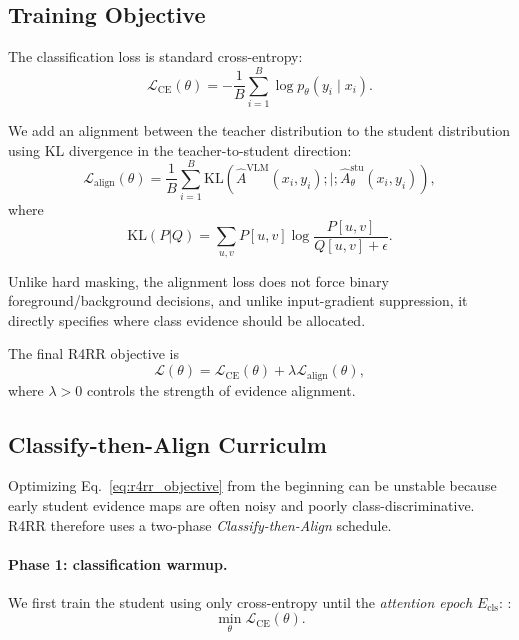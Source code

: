 \subsection{Training Objective}
\label{sec:objective}

The classification loss is standard cross-entropy:
\begin{equation}
\mathcal{L}_{\mathrm{CE}}(\theta)=-\frac{1}{B}
\sum_{i=1}^{B}
\log p_\theta(y_i\mid x_i).
\end{equation}


We add an alignment between the teacher distribution to the student distribution using KL divergence in the teacher-to-student direction:
\begin{equation}
\mathcal{L}_{\mathrm{align}}(\theta)=\frac{1}{B}
\sum_{i=1}^{B}
\mathrm{KL}\left(
\hat{A}^{\mathrm{VLM}}(x_i,y_i)
;|;
\hat{A}^{\mathrm{stu}}_\theta(x_i,y_i)
\right),
\end{equation}
where
\begin{equation}
\mathrm{KL}(P|Q)=\sum_{u,v}P[u,v]\log\frac{P[u,v]}{Q[u,v]+\epsilon}.
\end{equation}

Unlike hard masking, the alignment loss does not force binary foreground/background decisions, and unlike input-gradient suppression, it directly specifies where class evidence should be allocated.


The final R4RR objective is
\begin{equation}
\mathcal{L}(\theta)=\mathcal{L}_{\mathrm{CE}}(\theta)
+
\lambda \mathcal{L}_{\mathrm{align}}(\theta),
\label{eq:r4rr_objective}
\end{equation}
where $\lambda>0$ controls the strength of evidence alignment.

\subsection{Classify-then-Align Curriculm}
\label{sec:classify_then_align}

Optimizing Eq.~\eqref{eq:r4rr_objective} from the beginning can be unstable because early student evidence maps are often noisy and poorly class-discriminative. R4RR therefore uses a two-phase \emph{Classify-then-Align} schedule.

\paragraph{Phase 1: classification warmup.}
We first train the student using only cross-entropy until the \emph{attention epoch} $E_{\mathrm{cls}}$: :
\begin{equation}
\min_{\theta}\mathcal{L}_{\mathrm{CE}}(\theta).
\end{equation}

